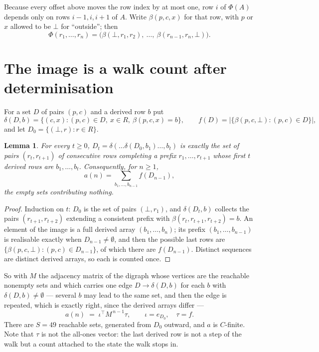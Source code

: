 \documentclass[11pt,a4paper]{article}
\theoremstyle{plain}
\newtheorem{lemma}[theorem]{Lemma}
\theoremstyle{definition}
\begin{document}
Because every offset above moves the row index by at most one, row $i$ of
$\Phi(A)$ depends only on rows $i-1,i,i+1$ of $A$. Write $\beta(p,c,x)$ for that row, with $p$
or $x$ allowed to be $\bot$ for ``outside''; then
\[
\Phi(r_1,\dots,r_n)=\bigl(\beta(\bot,r_1,r_2),\ \dots,\ \beta(r_{n-1},r_n,\bot)\bigr).
\]

\section{The image is a walk count after determinisation}

For a set $D$ of pairs $(p,c)$ and a derived row $b$ put
\[
\delta(D,b)=\{(c,x):(p,c)\in D,\ x\in R,\ \beta(p,c,x)=b\},\qquad
f(D)=\bigl|\{\beta(p,c,\bot):(p,c)\in D\}\bigr| ,
\]
and let $D_0=\{(\bot,r):r\in R\}$.

\begin{lemma}\label{lem:det}
For every $t\ge0$, $D_t=\delta(\dots\delta(D_0,b_1)\dots,b_t)$ is exactly the set of pairs
$(r_t,r_{t+1})$ of consecutive rows completing a prefix $r_1,\dots,r_{t+1}$ whose first $t$
derived rows are $b_1,\dots,b_t$. Consequently, for $n\ge1$,
\[
a(n)=\sum_{b_1,\dots,b_{n-1}}f(D_{n-1}),
\]
the empty sets contributing nothing.
\end{lemma}

\begin{proof}
Induction on $t$: $D_0$ is the set of pairs $(\bot,r_1)$, and $\delta(D_t,b)$ collects the
pairs $(r_{t+1},r_{t+2})$ extending a consistent prefix with
$\beta(r_t,r_{t+1},r_{t+2})=b$. An element of the image is a full derived array
$(b_1,\dots,b_n)$; its prefix $(b_1,\dots,b_{n-1})$ is realisable exactly when
$D_{n-1}\neq\emptyset$, and then the possible last rows are
$\{\beta(p,c,\bot):(p,c)\in D_{n-1}\}$, of which there are $f(D_{n-1})$. Distinct sequences
are distinct derived arrays, so each is counted once.
\end{proof}

So with $M$ the adjacency matrix of the digraph whose vertices are the reachable nonempty sets
and which carries one edge $D\to\delta(D,b)$ for each $b$ with $\delta(D,b)\neq\emptyset$ ---
several $b$ may lead to the same set, and then the edge is repeated, which is exactly right,
since the derived arrays differ ---
\[
a(n)\;=\;\iota^{\!\top}M^{\,n-1}\tau,\qquad \iota=e_{D_0},\quad \tau=f .
\]
There are $S=49$ reachable sets, generated from $D_0$ outward, and $a$ is $C$-finite.
Note that $\tau$ is not the all-ones vector: the last derived row is not a
step of the walk but a count attached to the state the walk stops in.
\end{document}
